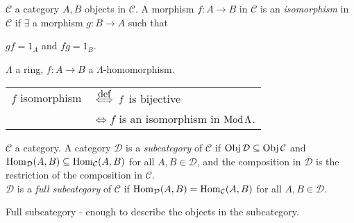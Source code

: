 \begin{defin}
  $\mathcal{C}$ a category $A,B$ objects in $\mathcal{C}$. A morphism
  $f\colon A\to B$ in $\mathcal{C}$ is an \emph{isomorphism} in
  $\mathcal{C}$ if $\exists$ a morphism $g\colon B\to A$ such that\\ 
  \centerline{$gf = 1_A$ and $fg=1_B$.}
\end{defin}
\begin{note}
$\Lambda$ a ring, $f\colon A\to B$ a $\Lambda$-homomorphism.\\
\begin{tabular}{cl}
$f$ isomorphism & $\stackrel{\mathclap{\normalfont\mbox{def}}}{\iff}
                  f$ is bijective\\ 
& $\iff f$ is an isomorphism in $\operatorname{Mod}\Lambda$. 
\end{tabular}
\end{note}


\begin{defin}
$\mathcal{C}$ a category. A category $\mathcal{D}$ is a
\emph{subcategory} of $\mathcal{C}$ if $\operatorname{Obj}\mathcal{D} \subseteq
\operatorname{Obj}\mathcal{C}$ and $\operatorname{Hom}_\mathcal{D}(A,B) \subseteq
\operatorname{Hom}_\mathcal{C}(A,B)$ for all $A,B \in \mathcal{D}$, and the
composition in $\mathcal{D}$ is the restriction of the composition in
$\mathcal{C}$.\\ 
$\mathcal{D}$ is a \emph{full subcategory} of $\mathcal{C}$ if
$\operatorname{Hom}_\mathcal{D}(A,B) = \operatorname{Hom}_\mathcal{C}(A,B)$ for all $A,B \in
\mathcal{D}$. 
\end{defin}
\begin{note}
Full subcategory - enough to describe the objects in the subcategory.
\end{note}

